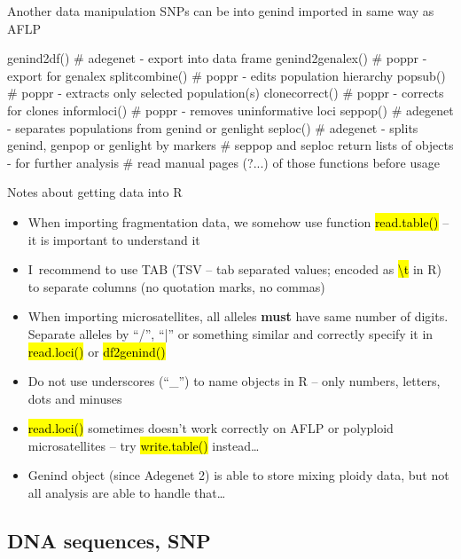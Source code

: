 \documentclass[compress, ucs, xelatex, 11pt, xcolor=svgnames,
  hyperref={
    bookmarks=true,
    unicode=true,
    colorlinks=true,
    pdftitle={Molecular data in R},
    plainpages=false,
    pdfauthor={Vojtech Zeisek},
    pdfsubject={Course about phylogeny and evolution in R},
    pdfcreator={XeLaTeX},
    pdfkeywords={R, evolution, phylogeny, molecular data},
    linkcolor=Tomato,
    anchorcolor=SaddleBrown,
    citecolor=Goldenrod,
    filecolor=DarkMagenta,
    menucolor=Sienna,
    urlcolor=DarkTurquoise,
    pdftex},
  url={hyphens, lowtilde} %
  ]{beamer}
\renewcommand{\texttt}[1]{\hl{\ttfamily #1}}
\begin{document}
\begin{frame}[fragile]{Another data manipulation}
SNPs can be into genind imported in same way as AFLP
  \begin{spluscode}
    genind2df() # adegenet - export into data frame
    genind2genalex() # poppr - export for genalex
    splitcombine() # poppr - edits population hierarchy
    popsub() # poppr - extracts only selected population(s)
    clonecorrect() # poppr - corrects for clones
    informloci() # poppr - removes uninformative loci
    seppop() # adegenet - separates populations from genind or genlight
    seploc() # adegenet - splits genind, genpop or genlight by markers
    # seppop and seploc return lists of objects - for further analysis
    # read manual pages (?...) of those functions before usage
  \end{spluscode}
\end{frame}

\begin{frame}{Notes about getting data into R}
\begin{itemize}
 \item When importing fragmentation data, we somehow use function \texttt{read.table()} -- it is important to understand it
 \item I~recommend to use TAB (TSV -- tab separated values; encoded as \texttt{\textbackslash t} in R) to separate columns (no quotation marks, no commas)
 \item When importing microsatellites, all alleles \textbf{must} have same number of digits. Separate alleles by ``/'', ``|'' or something similar and correctly specify it in \texttt{read.loci()} or \texttt{df2genind()}
 \item Do not use underscores (``\_'') to name objects in R -- only numbers, letters, dots and minuses
 \item \texttt{read.loci()} sometimes doesn't work correctly on AFLP or polyploid microsatellites -- try \texttt{write.table()} instead\ldots
 \item Genind object (since Adegenet 2) is able to store mixing ploidy data, but not all analysis are able to handle that\ldots
\end{itemize}
\end{frame}

\subsection{DNA sequences, SNP}
\end{document}
